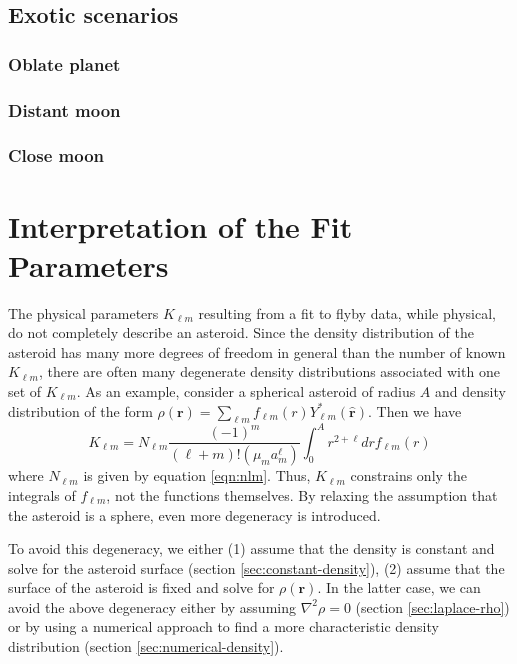 \documentclass[linenumbers]{aastex631}
\newcommand{\unit}[1]{\hat{\mathbf{#1}}}
\begin{document}
\subsection{Exotic scenarios}

\subsubsection{Oblate planet}

\subsubsection{Distant moon}

\subsubsection{Close moon}




\section{Interpretation of the Fit Parameters}
The physical parameters $K_{\ell m}$ resulting from a fit to flyby data, while physical, do not completely describe an asteroid. Since the density distribution of the asteroid has many more degrees of freedom in general than the number of known $K_{\ell m}$, there are often many degenerate density distributions associated with one set of $K_{\ell m}$. As an example, consider a spherical asteroid of radius $A$ and density distribution of the form $\rho(\mathbf r) = \sum_{\ell m} f_{\ell m}(r) Y_{\ell m}^*(\unit r)$. Then we have
\begin{equation}
K_{\ell m} = N_{\ell m} \frac{(-1)^m}{(\ell + m)!(\mu_m a_m^\ell)}\int_0^A r^{2+\ell} dr f_{\ell m}(r)
\end{equation}
where $N_{\ell m}$ is given by equation \ref{eqn:nlm}. Thus, $K_{\ell m}$ constrains only the integrals of $f_{\ell m}$, not the functions themselves. By relaxing the assumption that the asteroid is a sphere, even more degeneracy is introduced.

To avoid this degeneracy, we either (1) assume that the density is constant and solve for the asteroid surface (section \ref{sec:constant-density}), (2) assume that the surface of the asteroid is fixed and solve for $\rho(\mathbf r)$. In the latter case, we can avoid the above degeneracy either by assuming $\nabla^2 \rho = 0$ (section \ref{sec:laplace-rho}) or by using a numerical approach to find a more characteristic density distribution (section \ref{sec:numerical-density}).
\end{document}
